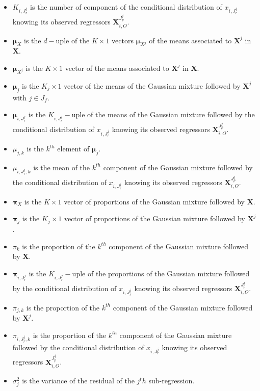 \documentclass[12pt,a4paper]{report}
\begin{document}
\begin{appendices}
\begin{itemize}
	\item $K_{i,J_r^j}$ is the number of component of the conditional distribution of $x_{i,J_r^j}$ knowing its observed regressors $\boldsymbol{X}_{i,O}^{J_p^j}$.
	\item $\boldsymbol{\mu}_X$ is the $d-$uple of the $K \times 1$ vectors $\boldsymbol{\mu}_{X^j}$ of the means associated to $\boldsymbol{X}^j$ in $\boldsymbol{X}$.
	\item $\boldsymbol{\mu}_{X^j}$ is the $K \times 1$ vector of the means associated to $\boldsymbol{X}^j$ in $\boldsymbol{X}$.
	\item $\boldsymbol{\mu}_j$ is the $K_j \times 1$ vector of the means of the Gaussian mixture followed by $\boldsymbol{X}^j$ with $j\in J_f$.
	\item $\boldsymbol{\mu}_{i,J_r^j}$ is the $K_{i,J_r^j}-$uple of the means of the Gaussian mixture followed by the conditional distribution of $x_{i,J_r^j}$ knowing its observed regressors $\boldsymbol{X}_{i,O}^{J_p^j}$.	
	\item $\mu_{j,k}$ is the $k^{th}$ element of $\boldsymbol{\mu}_j$.
	\item $\mu_{i,J_r^j,k}$ is the mean of the $k^{th}$ component of the Gaussian mixture followed by the conditional distribution of $x_{i,J_r^j}$ knowing its observed regressors $\boldsymbol{X}_{i,O}^{J_p^j}$.
	\item $\boldsymbol{\pi}_X$ is the $K \times 1 $ vector of proportions of the Gaussian mixture followed by $\boldsymbol{X}$.
	\item $\boldsymbol{\pi}_j$ is the $K_j \times 1 $ vector of proportions of the Gaussian mixture followed by $\boldsymbol{X}^j$.
	\item $\pi_k$ is the proportion of the $k^{th}$ component of the Gaussian mixture followed by $\boldsymbol{X}$.
	\item $\boldsymbol{\pi}_{i,J_r^j}$ is the $K_{i,J_r^j}-$uple of the proportions of the Gaussian mixture followed by the conditional distribution of $x_{i,J_r^j}$ knowing its observed regressors $\boldsymbol{X}_{i,O}^{J_p^j}$.
	\item $\pi_{j,k}$ is the proportion of the $k^{th}$ component of the Gaussian mixture followed by $\boldsymbol{X}^j$.
	\item $\pi_{i,J_r^j,k}$ is the proportion of the $k^{th}$ component of the Gaussian mixture followed by the conditional distribution of $x_{i,J_r^j}$ knowing its observed regressors $\boldsymbol{X}_{i,O}^{J_p^j}$.
	\item $\sigma_j^2$ is the variance of the residual of the $j^th$ sub-regression.	

\end{itemize}
\end{appendices}
\end{document}
